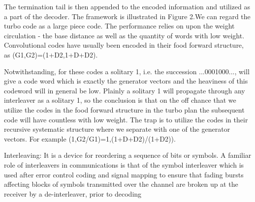 \documentclass[conference,a4paper]{IEEEtran}
\begin{document}
The termination tail is then appended to the encoded information and utilized as a part of the decoder. The framework is illustrated in Figure 2.We can regard the turbo code as a large piece code. The performance relies on upon the weight circulation - the base distance as well as the quantity of words with low weight. Convolutional codes have usually been encoded in their food forward structure, as (G1,G2)=(1+D2,1+D+D2). 

Notwithstanding, for these codes a solitary 1, i.e. the succession ...0001000..., will give a code word which is exactly the generator vectors and the heaviness of this codeword will in general be low. Plainly a solitary 1 will propagate through any interleaver as a solitary 1, so the conclusion is that on the off chance that we utilize the codes in the food forward structure in the turbo plan the subsequent code will have countless with low weight. The trap is to utilize the codes in their recursive systematic structure where we separate with one of the generator vectors. For example  (1,G2/G1)=1,(1+D+D2)/(1+D2)). 
 



Interleaving: It is a device for reordering a sequence of bits or symbols. A familiar role of interleavers in communications is that of the symbol interleaver which is used after error control coding and signal mapping to ensure that fading bursts affecting blocks of symbols transmitted over the channel are broken up at the receiver by a de-interleaver, prior to decoding
\end{document}

